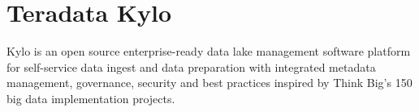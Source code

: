 \section{Teradata Kylo}
Kylo is an open source enterprise-ready data lake management software platform
for self-service data ingest and data preparation with integrated metadata 
management, governance, security and best practices inspired by Think Big's 150
big data implementation projects.
\cite{Teradata Kylo}

